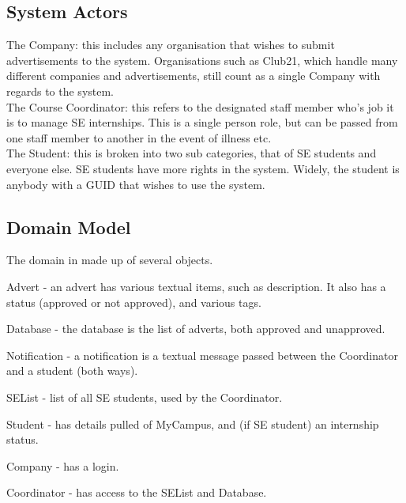 \documentclass{l3deliverable}
\begin{document}
\subsection{System Actors}

The Company: this includes any organisation that wishes to submit 
advertisements to the system. Organisations such as Club21, which handle
many different companies and advertisements, still count as a single Company
with regards to the system.\\

The Course Coordinator: this refers to the designated staff member who's job
it is to manage SE internships. This is a single person role, but can be 
passed from one staff member to another in the event of illness etc.\\

The Student: this is broken into two sub categories, that of SE students and
everyone else. SE students have more rights in the system. Widely, the student
is anybody with a GUID that wishes to use the system.\\


\subsection{Domain Model}


The domain in made up of several objects.

Advert - an advert has various textual items, such as description. It also
has a status (approved or not approved), and various tags.

Database - the database is the list of adverts, both approved and unapproved.

Notification - a notification is a textual message passed between the 
Coordinator and a student (both ways).

SEList - list of all SE students, used by the Coordinator. 

Student - has details pulled of MyCampus, and (if SE student) an internship 
status.

Company - has a login.

Coordinator - has access to the SEList and Database.
\end{document}
